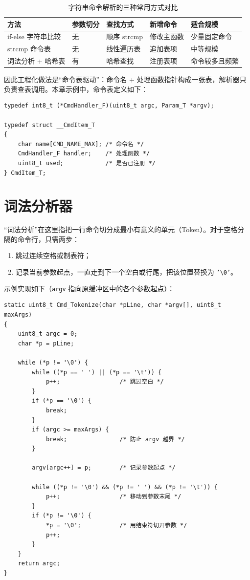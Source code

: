 \begin{table}[htbp]
\centering \caption{字符串命令解析的三种常用方式对比} \label{tab:cmd-method}
    \begin{tabular}{lllll}
        \toprule
        方法 & 参数切分 & 查找方式 & 新增命令 & 适合规模 \\
        \midrule
        if-else 字符串比较 & 无 & 顺序 strcmp & 修改主函数 & 少量固定命令 \\
        strcmp 命令表 & 无 & 线性遍历表 & 追加表项 & 中等规模 \\
        词法分析 + 哈希表 & 有 & 哈希查找 & 注册表项 & 命令较多且频繁 \\
        \bottomrule
    \end{tabular}
\end{table}

因此工程化做法是“命令表驱动”：命令名 + 处理函数指针构成一张表，解析器只负责查表调用。本章示例中，命令表定义如下：

\begin{lstlisting}[style=c]
typedef int8_t (*CmdHandler_F)(uint8_t argc, Param_T *argv);

typedef struct __CmdItem_T
{
    char name[CMD_NAME_MAX]; /* 命令名 */
    CmdHandler_F handler;    /* 处理函数 */
    uint8_t used;            /* 是否已注册 */
} CmdItem_T;
\end{lstlisting}

\section{词法分析器}

“词法分析”在这里指把一行命令切分成最小有意义的单元（Token）。对于空格分隔的命令行，只需两步：

\begin{enumerate}
\item 跳过连续空格或制表符；
\item 记录当前参数起点，一直走到下一个空白或行尾，把该位置替换为 \texttt{'\textbackslash0'}。
\end{enumerate}

示例实现如下（\texttt{argv} 指向原缓冲区中的各个参数起点）：

\begin{lstlisting}[style=c]
static uint8_t Cmd_Tokenize(char *pLine, char *argv[], uint8_t maxArgs)
{
    uint8_t argc = 0;
    char *p = pLine;

    while (*p != '\0') {
        while ((*p == ' ') || (*p == '\t')) {
            p++;                 /* 跳过空白 */
        }
        if (*p == '\0') {
            break;
        }
        if (argc >= maxArgs) {
            break;               /* 防止 argv 越界 */
        }

        argv[argc++] = p;        /* 记录参数起点 */

        while ((*p != '\0') && (*p != ' ') && (*p != '\t')) {
            p++;                 /* 移动到参数末尾 */
        }
        if (*p != '\0') {
            *p = '\0';           /* 用结束符切开参数 */
            p++;
        }
    }
    return argc;
}
\end{lstlisting}

